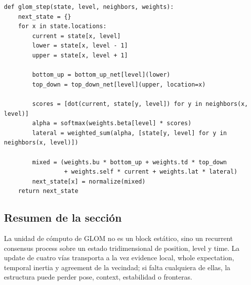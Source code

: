 \begin{lstlisting}[caption={Pseudocódigo didáctico de una sola settling update de GLOM}]
def glom_step(state, level, neighbors, weights):
    next_state = {}
    for x in state.locations:
        current = state[x, level]
        lower = state[x, level - 1]
        upper = state[x, level + 1]

        bottom_up = bottom_up_net[level](lower)
        top_down = top_down_net[level](upper, location=x)

        scores = [dot(current, state[y, level]) for y in neighbors(x, level)]
        alpha = softmax(weights.beta[level] * scores)
        lateral = weighted_sum(alpha, [state[y, level] for y in neighbors(x, level)])

        mixed = (weights.bu * bottom_up + weights.td * top_down
                 + weights.self * current + weights.lat * lateral)
        next_state[x] = normalize(mixed)
    return next_state
\end{lstlisting}

\subsection{Resumen de la sección}

La unidad de cómputo de GLOM no es un block estático, sino un recurrent consensus process sobre un estado tridimensional de position, level y time. La update de cuatro vías transporta a la vez evidence local, whole expectation, temporal inertia y agreement de la vecindad; si falta cualquiera de ellas, la estructura puede perder pose, context, estabilidad o fronteras.
